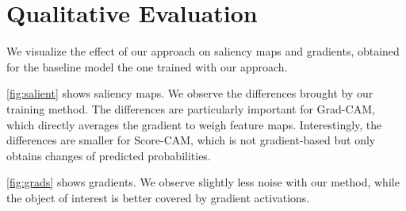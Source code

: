 \section{Qualitative Evaluation}
\label{sec:grad_qual}
We visualize the effect of our approach on saliency maps and gradients, obtained for the baseline 
model \vs the one trained with our approach.



\noindent \autoref{fig:salient} shows saliency maps. We observe the differences brought by our 
training method. The differences are particularly important for Grad-CAM, which directly averages 
the gradient to weigh feature maps. Interestingly, the differences are smaller for Score-CAM, which 
is not gradient-based but only obtains changes of predicted probabilities.


\noindent \autoref{fig:grads} shows gradients. We observe slightly less noise with our method, while 
the object of interest is better covered by gradient activations.

